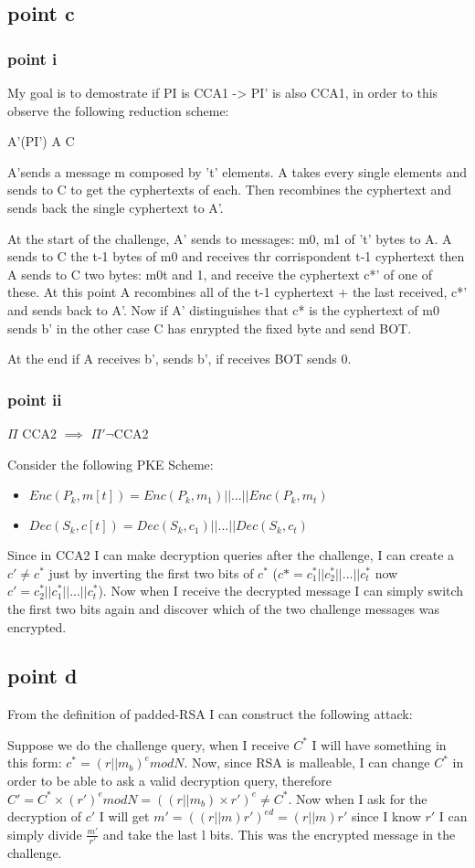 \subsection{point c}
\subsubsection{point i}

My goal is to demostrate if PI is CCA1 -> PI' is also CCA1, in order to this observe the following reduction scheme:


A'(PI')  A  C


A'sends a message m composed by 't' elements. A takes every single elements and sends to C to get the cyphertexts of each.
Then recombines the cyphertext and sends back the single cyphertext to A'.

At the start of the challenge, A' sends to messages: m0, m1 of 't' bytes to A.
A sends to C the t-1 bytes of m0 and receives thr corrispondent t-1 cyphertext then A sends to C two bytes:
m0t and 1, and receive the cyphertext c*' of one of these.
At this point A recombines all of the t-1 cyphertext + the last received, c*' and sends back to A'.
Now if A' distinguishes that c* is the cyphertext of m0 sends b' in the other case C has enrypted the fixed byte and send BOT.

At the end if A receives b', sends b', if receives BOT sends 0.

\subsubsection{point ii}

$\Pi$ CCA2 $\implies$ $\Pi' \neg$CCA2

Consider the following PKE Scheme:
\begin{itemize}
    \item $Enc(P_k,m[t])=Enc(P_k,m_1)||...||Enc(P_k,m_t)$
    \item $Dec(S_k,c[t])=Dec(S_k,c_1)||...||Dec(S_k,c_t)$
\end{itemize}
Since in CCA2 I can make decryption queries after the challenge, I can create a $c'\neq c^*$ just by inverting the first two bits of $c^*$ ($c*=c_1^*||c_2^*||...||c^*_t$ now $c'=c_2^*||c_1^*||...||c^*_t$). Now when I receive the decrypted message I can simply switch the first two bits again and discover which of the two challenge messages was encrypted.

\subsection{point d}

From the definition of padded-RSA I can construct the following attack:

Suppose we do the challenge query, when I receive $C^*$ I will have something in this form: $c^*=(r||m_b)^e mod N$. Now, since RSA is malleable, I can change $C^*$ in order to be able to ask a valid decryption query, therefore $C'=C^*\times(r')^e mod N= ((r||m_b) \times r')^e\neq C^*$. Now when I ask for the decryption of $c'$ I will get $m'=((r||m)r')^{ed}=(r||m)r'$ since I know $r'$ I can simply divide $\frac{m'}{r'}$ and take the last l bits. This was the encrypted message in the challenge. 
